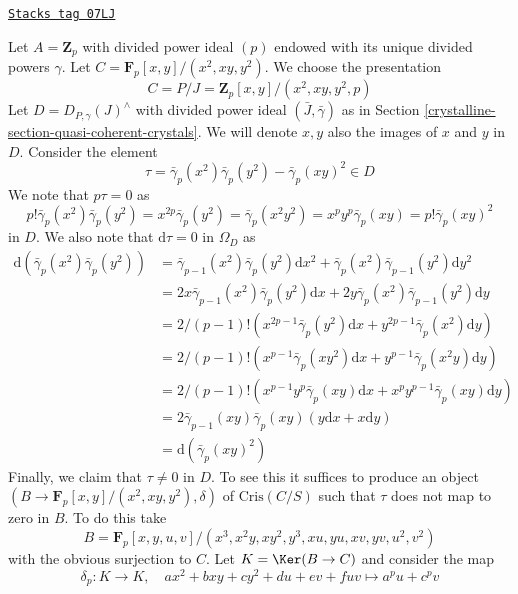 \begin{example}[Torsion]
\label{crystalline-example-torsion}
\href{https://stacks.math.columbia.edu/tag/07LJ}{\texttt{Stacks tag 07LJ}}

Let $A = \mathbf{Z}_p$ with divided power ideal $(p)$ endowed with
its unique divided powers $\gamma$. Let
$C = \mathbf{F}_p[x, y]/(x^2, xy, y^2)$. We choose the presentation
$$
C = P/J = \mathbf{Z}_p[x, y]/(x^2, xy, y^2, p)
$$
Let $D = D_{P, \gamma}(J)^\wedge$ with divided power ideal
$(\bar J, \bar \gamma)$ as in Section \ref{crystalline-section-quasi-coherent-crystals}.
We will denote $x, y$ also the images of $x$ and $y$ in $D$.
Consider the element
$$
\tau = \bar\gamma_p(x^2)\bar\gamma_p(y^2) - \bar\gamma_p(xy)^2 \in D
$$
We note that $p\tau = 0$ as
$$
p! \bar\gamma_p(x^2) \bar\gamma_p(y^2) =
x^{2p} \bar\gamma_p(y^2) = \bar\gamma_p(x^2y^2) =
x^py^p \bar\gamma_p(xy) = p! \bar\gamma_p(xy)^2
$$
in $D$. We also note that $\text{d}\tau = 0$ in $\Omega_D$ as
\begin{align*}
\text{d}(\bar\gamma_p(x^2) \bar\gamma_p(y^2))
& =
\bar\gamma_{p - 1}(x^2)\bar\gamma_p(y^2)\text{d}x^2 +
\bar\gamma_p(x^2)\bar\gamma_{p - 1}(y^2)\text{d}y^2 \\
& =
2 x \bar\gamma_{p - 1}(x^2)\bar\gamma_p(y^2)\text{d}x +
2 y \bar\gamma_p(x^2)\bar\gamma_{p - 1}(y^2)\text{d}y \\
& =
2/(p - 1)!( x^{2p - 1} \bar\gamma_p(y^2)\text{d}x +
y^{2p - 1} \bar\gamma_p(x^2)\text{d}y ) \\
& =
2/(p - 1)!
(x^{p - 1} \bar\gamma_p(xy^2)\text{d}x +
y^{p - 1} \bar\gamma_p(x^2y)\text{d}y) \\
& =
2/(p - 1)!
(x^{p - 1}y^p \bar\gamma_p(xy)\text{d}x +
x^py^{p - 1} \bar\gamma_p(xy)\text{d}y) \\
& =
2 \bar\gamma_{p - 1}(xy) \bar\gamma_p(xy)(y\text{d}x + x \text{d}y) \\
& =
\text{d}(\bar\gamma_p(xy)^2)
\end{align*}
Finally, we claim that $\tau \not = 0$ in $D$. To see this it suffices to
produce an object $(B \to \mathbf{F}_p[x, y]/(x^2, xy, y^2), \delta)$
of $\text{Cris}(C/S)$ such that $\tau$ does not map to zero in $B$.
To do this take
$$
B = \mathbf{F}_p[x, y, u, v]/(x^3, x^2y, xy^2, y^3, xu, yu, xv, yv, u^2, v^2)
$$
with the obvious surjection to $C$. Let $K = \Ker(B \to C)$ and
consider the map
$$
\delta_p : K \longrightarrow K,\quad
ax^2 + bxy + cy^2 + du + ev + fuv \longmapsto a^pu + c^pv
$$
\end{example}
